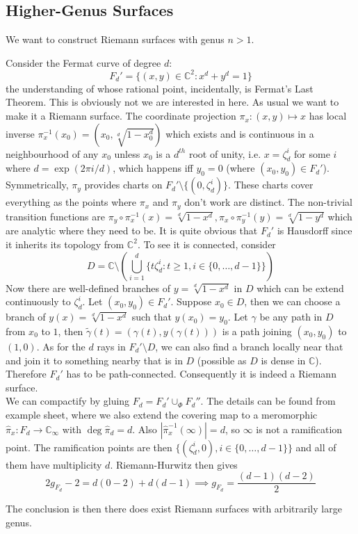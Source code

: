 \subsection{Higher-Genus Surfaces}
We want to construct Riemann surfaces with genus $n>1$.
\begin{example}
    Consider the Fermat curve of degree $d$:
    $$F_d'=\{(x,y)\in\mathbb C^2:x^d+y^d=1\}$$
    the understanding of whose rational point, incidentally, is Fermat's Last Theorem.
    This is obviously not we are interested in here.
    As usual we want to make it a Riemann surface.
    The coordinate projection $\pi_x:(x,y)\mapsto x$ has local inverse $\pi_x^{-1}(x_0)=(x_0,\sqrt[d]{1-x_0^d})$ which exists and is continuous in a neighbourhood of any $x_0$ unless $x_0$ is a $d^{th}$ root of unity, i.e. $x=\zeta_d^i$ for some $i$ where $d=\exp(2\pi i/d)$, which happens iff $y_0=0$ (where $(x_0,y_0)\in F_d'$).
    Symmetrically, $\pi_y$ provides charts on $F_d'\setminus\{(0,\zeta_d^i)\}$.
    These charts cover everything as the points where $\pi_x$ and $\pi_y$ don't work are distinct.
    The non-trivial transition functions are $\pi_y\circ\pi_x^{-1}(x)=\sqrt[d]{1-x^d},\pi_x\circ\pi_y^{-1}(y)=\sqrt[d]{1-y^d}$ which are analytic where they need to be.
    It is quite obvious that $F_d'$ is Hausdorff since it inherits its topology from $\mathbb C^2$.
    To see it is connected, consider
    $$D=\mathbb C\setminus\left(\bigcup_{i=1}^d\{t\zeta_d^i:t\ge 1,i\in\{0,\ldots,d-1\}\}\right)$$
    Now there are well-defined branches of $y=\sqrt[d]{1-x^d}$ in $D$ which can be extend continuously to $\zeta_d^i$.
    Let $(x_0,y_0)\in F_d'$.
    Suppose $x_0\in D$, then we can choose a branch of $y(x)=\sqrt[d]{1-x^d}$ such that $y(x_0)=y_0$.
    Let $\gamma$ be any path in $D$ from $x_0$ to $1$, then $\tilde\gamma(t)=(\gamma(t),y(\gamma(t)))$ is a path joining $(x_0,y_0)$ to $(1,0)$.
    As for the $d$ rays in $F_d'\setminus D$, we can also find a branch locally near that and join it to something nearby that is in $D$ (possible as $D$ is dense in $\mathbb C$).
    Therefore $F_d'$ has to be path-connected.
    Consequently it is indeed a Riemann surface.\\
    We can compactify by gluing $F_d=F_d'\cup_\Phi F_d''$.
    The details can be found from example sheet, where we also extend the covering map to a meromorphic $\hat\pi_x:F_d\to\mathbb C_\infty$ with $\deg\hat\pi_d=d$.
    Also $|\hat\pi_x^{-1}(\infty)|=d$, so $\infty$ is not a ramification point.
    The ramification points are then $\{(\zeta_d^i,0),i\in\{0,\ldots,d-1\}\}$ and all of them have multiplicity $d$.
    Riemann-Hurwitz then gives
    $$2g_{F_d}-2=d(0-2)+d(d-1)\implies g_{F_d}=\frac{(d-1)(d-2)}{2}$$
\end{example}
The conclusion is then there does exist Riemann surfaces with arbitrarily large genus.
